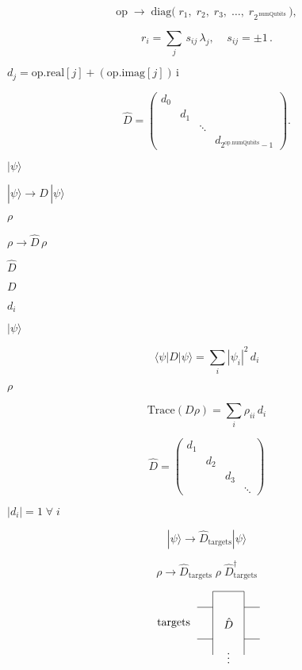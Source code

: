\documentclass{article}
\begin{document}
\[
     \text{op} \; \rightarrow \; \text{diag}
         \big( \; r_1, \; r_2, \; r_3, \; \dots, \; r_{2^{\,\text{numQubits}}} \, \big),
\]
\pagebreak

\[
      r_i = \sum\limits_j \, s_{ij} \, \lambda_j, \;\;\;\; s_{ij} = \pm  1 \,.
\]
\pagebreak

$d_j = \text{op.real}[j] + (\text{op.imag}[j])\,\text{i} $
\pagebreak

\[
 \hat{D} = \begin{pmatrix}
 d_0 \\
 & d_1 \\
 & & \ddots \\
 & & & d_{2^{\text{op.numQubits}}-1}
 \end{pmatrix}.
\]
\pagebreak

$|\psi\rangle$
\pagebreak

$|\psi\rangle \rightarrow \hat{D} \, |\psi\rangle$
\pagebreak

$\rho$
\pagebreak

$\rho \rightarrow \hat{D}\, \rho$
\pagebreak

$\hat{D}$
\pagebreak

$ D $
\pagebreak

$ d_i $
\pagebreak

$|\psi\rangle $
\pagebreak

\[
 \langle \psi | D | \psi \rangle = \sum_i |\psi_i|^2 \, d_i
\]
\pagebreak

$ \rho $
\pagebreak

\[ 
 \text{Trace}( D \rho ) = \sum_i \rho_{ii} \, d_i
\]
\pagebreak

\[
  \hat{D} = 
  \begin{pmatrix}
  d_1 & & & \\
  & d_2 & & \\
  & & d_3 & \\
  & & & \ddots
  \end{pmatrix}
  \]
\pagebreak

$|d_i|=1 \; \forall \; i$
\pagebreak

\[
       |\psi\rangle \rightarrow \hat{D}_{\text{targets}} |\psi\rangle
  \]
\pagebreak

\[
       \rho \rightarrow \hat{D}_{\text{targets}} \; \rho \; \hat{D}_{\text{targets}}^\dagger
  \]
\pagebreak

\[
            \begin{tikzpicture}[scale=.5]
            \node[draw=none] at (-3.5, 1) {targets};

            \draw (-2,0) -- (-1, 0);
            \draw (1, 0) -- (2, 0);
            \draw (-2,2) -- (-1, 2);
            \draw (1, 2) -- (2, 2);
            \draw (-1,-1)--(-1,3)--(1,3)--(1,-1);
            \node[draw=none] at (0, 1) {$\hat{D}$};
            \node[draw=none] at (0, -1) {$\vdots$};
            
            \end{tikzpicture}
\]
\pagebreak
\end{document}
